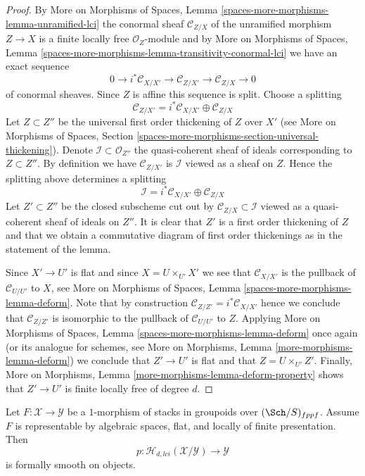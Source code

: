 \begin{proof}
By
More on Morphisms of Spaces,
Lemma \ref{spaces-more-morphisms-lemma-unramified-lci}
the conormal sheaf $\mathcal{C}_{Z/X}$ of the unramified morphism $Z \to X$
is a finite locally free $\mathcal{O}_Z$-module and by
More on Morphisms of Spaces,
Lemma \ref{spaces-more-morphisms-lemma-transitivity-conormal-lci}
we have an exact sequence
$$
0 \to i^*\mathcal{C}_{X/X'} \to
\mathcal{C}_{Z/X'} \to
\mathcal{C}_{Z/X} \to 0
$$
of conormal sheaves. Since $Z$ is affine this sequence is split. Choose
a splitting
$$
\mathcal{C}_{Z/X'} = i^*\mathcal{C}_{X/X'} \oplus \mathcal{C}_{Z/X}
$$
Let $Z \subset Z''$ be the universal first order thickening of $Z$
over $X'$ (see
More on Morphisms of Spaces,
Section \ref{spaces-more-morphisms-section-universal-thickening}).
Denote $\mathcal{I} \subset \mathcal{O}_{Z''}$ the quasi-coherent sheaf
of ideals corresponding to $Z \subset Z''$. By definition we have
$\mathcal{C}_{Z/X'}$ is $\mathcal{I}$ viewed as a sheaf on $Z$.
Hence the splitting above determines a splitting
$$
\mathcal{I} = i^*\mathcal{C}_{X/X'} \oplus \mathcal{C}_{Z/X}
$$
Let $Z' \subset Z''$ be the closed subscheme cut out by
$\mathcal{C}_{Z/X} \subset \mathcal{I}$ viewed as a quasi-coherent sheaf
of ideals on $Z''$. It is clear that $Z'$ is a first order thickening
of $Z$ and that we obtain a commutative diagram of first order thickenings
as in the statement of the lemma.

\medskip\noindent
Since $X' \to U'$ is flat and since $X = U \times_{U'} X'$ we see that
$\mathcal{C}_{X/X'}$ is the pullback of $\mathcal{C}_{U/U'}$ to $X$, see
More on Morphisms of Spaces, Lemma \ref{spaces-more-morphisms-lemma-deform}.
Note that by construction $\mathcal{C}_{Z/Z'} = i^*\mathcal{C}_{X/X'}$
hence we conclude that $\mathcal{C}_{Z/Z'}$ is isomorphic to the pullback
of $\mathcal{C}_{U/U'}$ to $Z$. Applying
More on Morphisms of Spaces, Lemma \ref{spaces-more-morphisms-lemma-deform}
once again (or its analogue for schemes, see
More on Morphisms, Lemma \ref{more-morphisms-lemma-deform})
we conclude that $Z' \to U'$ is flat and that $Z = U \times_{U'} Z'$.
Finally,
More on Morphisms, Lemma \ref{more-morphisms-lemma-deform-property}
shows that $Z' \to U'$ is finite locally free of degree $d$.
\end{proof}

\begin{lemma}
\label{lemma-lci-formally-smooth}
Let $F : \mathcal{X} \to \mathcal{Y}$ be a $1$-morphism of stacks in groupoids
over $(\Sch/S)_{fppf}$. Assume $F$ is representable by algebraic
spaces, flat, and locally of finite presentation. Then
$$
p : \mathcal{H}_{d, lci}(\mathcal{X}/\mathcal{Y}) \to \mathcal{Y}
$$
is formally smooth on objects.
\end{lemma}

